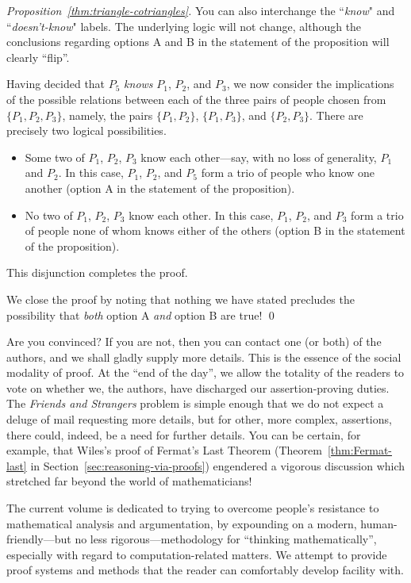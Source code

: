 \begin{proof}[Proposition~\ref{thm:triangle-cotriangles}]
{\begin{minipage}{0.96\textwidth}
You can also interchange the ``{\em know}" and ``{\em doesn't-know}" labels.  The underlying logic will not change, although the conclusions regarding options A and B in the statement of the proposition will clearly ``flip''.
\end{minipage} }

\bigskip

\noindent
Having decided that $P_5$ {\em knows} $P_1$, $P_2$, and $P_3$, we now consider the implications of the possible relations between each of the three pairs of people chosen from $\{P_1, P_2, P_3\}$, namely, the pairs  $\{P_1, P_2\}$, $\{P_1, P_3\}$, and $\{P_2, P_3\}$.  There
are precisely two logical possibilities.
\begin{itemize}
\item
Some two of $P_1$, $P_2$, $P_3$ know each other---say, with no loss of generality, $P_1$ and $P_2$.  In this case, $P_1$, $P_2$, and $P_5$ form a trio of people who know one another (option A in the statement of the proposition).
\medskip\item
No two of $P_1$, $P_2$, $P_3$ know each other.  In this case, $P_1$, $P_2$, and $P_3$ form a trio of people none of whom knows either of the others (option B in the statement of the proposition).
\end{itemize}
This disjunction completes the proof.

\smallskip

We close the proof by noting that nothing we have stated precludes the possibility that {\em both} option A {\em and} option B are true!  \qed
\end{proof}

Are you convinced?  If you are not, then you can contact one (or both) of the authors, and we shall gladly supply more details.  This is the essence of the social modality of proof.  At the ``end of the day'', we allow the totality of the readers to vote on whether we, the authors, have discharged our assertion-proving duties.  The {\it Friends and Strangers} problem is simple enough that we do not expect a deluge of mail requesting more details, but for other, more complex, assertions, there could, indeed, be a need for further details.  You can be certain, for example, that Wiles's proof of Fermat's Last Theorem (Theorem~\ref{thm:Fermat-last} in Section~\ref{sec:reasoning-via-proofs}) engendered a vigorous discussion which stretched far beyond the world of mathematicians!

\bigskip

The current volume is dedicated to trying to overcome people's resistance to mathematical analysis and argumentation, by expounding on a modern, human-friendly---but no less rigorous---methodology for ``thinking mathematically'', especially with regard to computation-related matters.  We attempt to provide proof systems and methods that the reader can
comfortably develop facility with.

